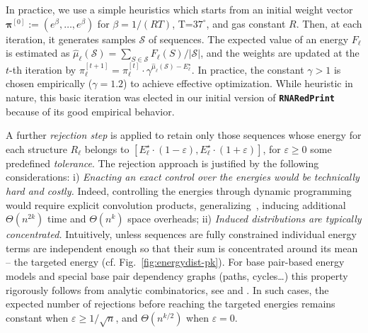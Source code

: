 \documentclass[]{bmcart}
\newcommand{\Def}[1]{\emph{#1}}
\newcommand{\TargetE}{E^{\star}}
\newcommand{\Nuc}[1]{{\sf #1}}
\newcommand{\Cb}{\Nuc{C}}
\newcommand{\Gb}{\Nuc{G}}
\newcommand{\GCb}{\Gb\Cb}
\newcommand{\Software}[1]{{\ttfamily #1}}
\newcommand{\ourprog}{{\tt \bfseries{}\color{black!85}RNA\textcolor{red!70!black}{Red}Print}}
\newcommand{\citep}[1]{\cite{#1}}
\begin{document}
In practice, we use a simple heuristics which starts from an initial weight vector $\pmb{\pi}^{[0]}:=(e^\beta,\dots,e^\beta)$ for $\beta=1/(RT)$, T=$37^\circ$, and gas constant $R$. Then, at each iteration, it generates samples $\mathcal{S}$ of sequences. The expected value of an energy $F_\ell$ is estimated as $\hat\mu_\ell(\mathcal{S}) = \sum_{S\in\mathcal{S}}F_\ell(S)/|\mathcal{S}|$, and the weights are updated at the $t$-th iteration by %
$\pi_\ell^{[t+1]} = \pi_\ell^{[t]}\cdot \gamma^{\hat\mu_\ell(\mathcal{S})-\TargetE_\ell}$. In practice, the constant $\gamma>1$ is chosen empirically  ($\gamma=1.2$) to achieve effective optimization.
While heuristic in nature, this basic iteration was elected in our initial version of \ourprog{} because of its good empirical behavior.

A further \Def{rejection step} is applied to retain only those sequences whose energy for each structure $R_\ell$ belongs to $[\TargetE_\ell\cdot(1-\varepsilon),\TargetE_\ell\cdot(1+\varepsilon)]$, for $\varepsilon\ge 0$ some predefined \Def{tolerance}. The rejection approach is justified by the following considerations:
i) \emph{Enacting an exact control over the energies would  be technically hard and costly.} Indeed, controlling the energies through dynamic programming would require explicit convolution products, generalizing~\citep{Cupal1996}, inducing additional $\Theta(n^{2k})$ time and $\Theta(n^k)$ space overheads;
ii) \emph{Induced distributions are typically concentrated.} Intuitively, unless sequences are fully constrained individual energy terms are independent enough so that their sum is concentrated around its mean -- the targeted energy (cf.{} Fig.~\ref{fig:energydist-pk}).
For base pair-based energy models and special base pair dependency graphs
(paths, cycles\ldots) this property rigorously follows from analytic
combinatorics, see \citep{Bender1983} and
\citep{Drmota1997}. In such cases, the expected number of
rejections before reaching the targeted energies remains constant when
$\varepsilon\ge 1/\sqrt{n}$, and $\Theta(n^{k/2})$ when
$\varepsilon=0$. 
\end{document}
